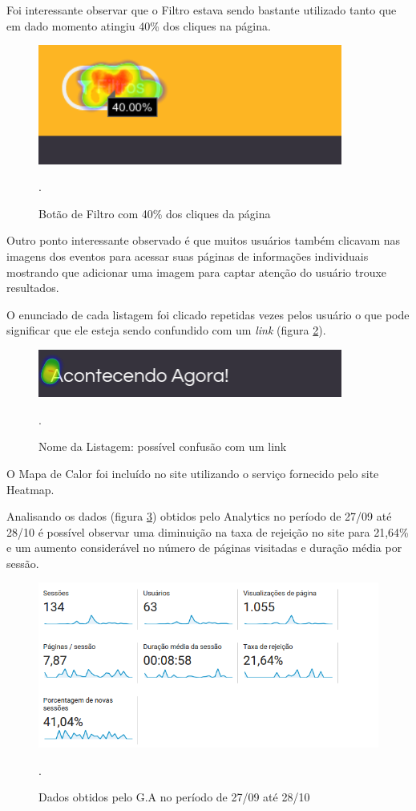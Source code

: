 \par Foi interessante observar que o Filtro estava sendo bastante utilizado tanto que em dado momento atingiu 40\% dos cliques na página.
\begin{figure}[htb]
\centering
\includegraphics[width=10cm]{figuras/heatmap_filter}
\caption{\label{fig:heatmap_filter} Botão de Filtro com 40\% dos cliques da página}.
\end{figure}

\par Outro ponto interessante observado é que muitos usuários também clicavam nas imagens dos eventos para acessar suas páginas de informações individuais mostrando que adicionar uma imagem para captar atenção do usuário trouxe resultados.

\par O enunciado de cada listagem foi clicado repetidas vezes pelos usuário o que pode significar que ele esteja sendo confundido com um \emph{link} (figura \ref{fig:heatmap_missclick}).
\begin{figure}[htb]
\centering
\includegraphics[width=10cm]{figuras/heatmap_missclick}
\caption{\label{fig:heatmap_missclick} Nome da Listagem: possível confusão com um link}.
\end{figure}
\par O Mapa de Calor foi incluído no site utilizando o serviço fornecido pelo site Heatmap.

\par Analisando os dados (figura \ref{fig:analytics_3ainteracao_dados}) obtidos pelo Analytics no período de 27/09 até 28/10 é possível observar uma diminuição na taxa de rejeição no site para 21,64\% e um aumento considerável no número de páginas visitadas e duração média por sessão.
\begin{figure}[htb]
\centering
\includegraphics[width=15cm]{figuras/analytics_3ainteracao_dados}
\caption{\label{fig:analytics_3ainteracao_dados} Dados obtidos pelo G.A no período de 27/09 até 28/10 }.
\end{figure}


